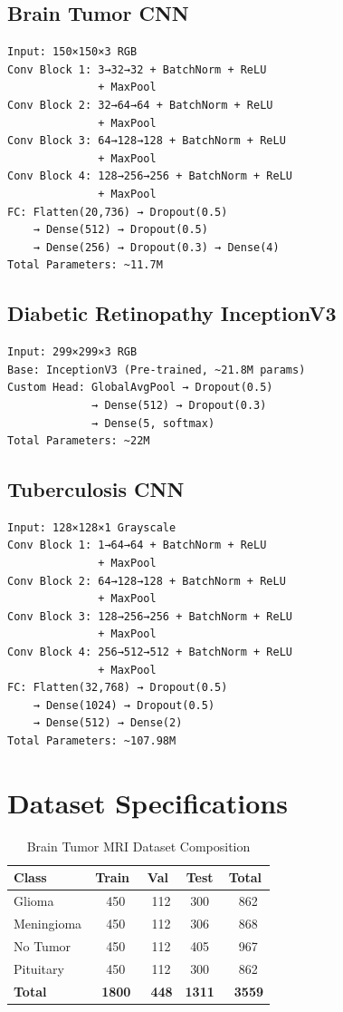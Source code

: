 \documentclass[conference]{IEEEtran}
\begin{document}
\subsection{Brain Tumor CNN}
\begin{verbatim}
Input: 150×150×3 RGB
Conv Block 1: 3→32→32 + BatchNorm + ReLU 
              + MaxPool
Conv Block 2: 32→64→64 + BatchNorm + ReLU 
              + MaxPool
Conv Block 3: 64→128→128 + BatchNorm + ReLU 
              + MaxPool
Conv Block 4: 128→256→256 + BatchNorm + ReLU 
              + MaxPool
FC: Flatten(20,736) → Dropout(0.5) 
    → Dense(512) → Dropout(0.5) 
    → Dense(256) → Dropout(0.3) → Dense(4)
Total Parameters: ~11.7M
\end{verbatim}

\subsection{Diabetic Retinopathy InceptionV3}
\begin{verbatim}
Input: 299×299×3 RGB
Base: InceptionV3 (Pre-trained, ~21.8M params)
Custom Head: GlobalAvgPool → Dropout(0.5) 
             → Dense(512) → Dropout(0.3) 
             → Dense(5, softmax)
Total Parameters: ~22M
\end{verbatim}

\subsection{Tuberculosis CNN}
\begin{verbatim}
Input: 128×128×1 Grayscale
Conv Block 1: 1→64→64 + BatchNorm + ReLU 
              + MaxPool
Conv Block 2: 64→128→128 + BatchNorm + ReLU 
              + MaxPool
Conv Block 3: 128→256→256 + BatchNorm + ReLU 
              + MaxPool
Conv Block 4: 256→512→512 + BatchNorm + ReLU 
              + MaxPool
FC: Flatten(32,768) → Dropout(0.5) 
    → Dense(1024) → Dropout(0.5) 
    → Dense(512) → Dense(2)
Total Parameters: ~107.98M
\end{verbatim}

\section{Dataset Specifications}

\begin{table}[!ht]
\centering
\caption{Brain Tumor MRI Dataset Composition}
\begin{tabular}{|l|c|c|c|c|}
\hline
\textbf{Class} & \textbf{Train} & \textbf{Val} & \textbf{Test} & \textbf{Total} \\
\hline
Glioma & ~450 & ~112 & 300 & ~862 \\
Meningioma & ~450 & ~112 & 306 & ~868 \\
No Tumor & ~450 & ~112 & 405 & ~967 \\
Pituitary & ~450 & ~112 & 300 & ~862 \\
\hline
\textbf{Total} & \textbf{~1800} & \textbf{~448} & \textbf{1311} & \textbf{~3559} \\
\hline
\end{tabular}
\end{table}
\end{document}
